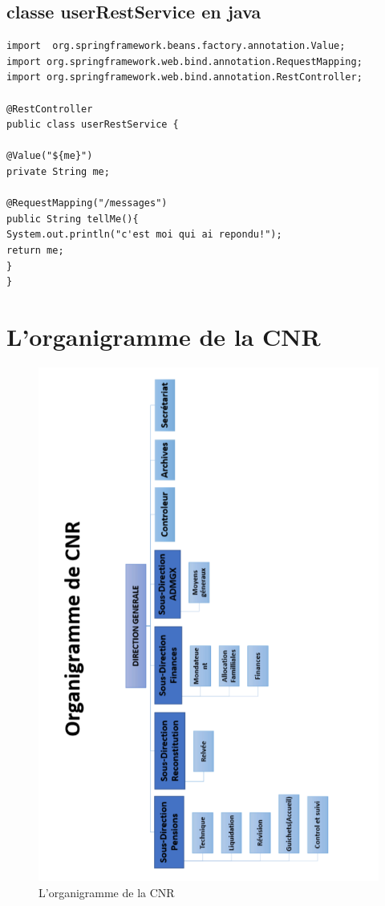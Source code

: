        \section{classe userRestService en java }
      \begin{lstlisting}
import  org.springframework.beans.factory.annotation.Value;
import org.springframework.web.bind.annotation.RequestMapping;
import org.springframework.web.bind.annotation.RestController;

@RestController
public class userRestService {

@Value("${me}")
private String me;

@RequestMapping("/messages")
public String tellMe(){
System.out.println("c'est moi qui ai repondu!");
return me;
}
}
      \end{lstlisting}  
        
        
  \chapter*{L'organigramme de la CNR}
        
\begin{figure}[H]
	\centering
	\includegraphics[width=1\linewidth,height=0.58\paperheight]{images/orgpdf}
	\caption{L'organigramme de la CNR}
	\label{fig:orgpdf}
\end{figure}
